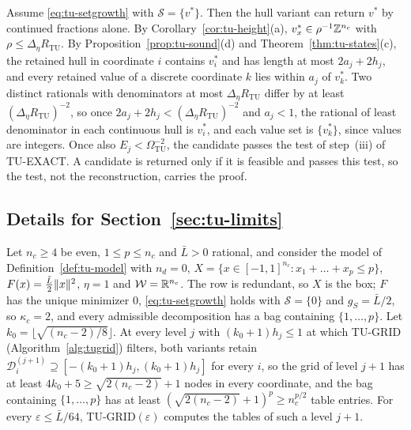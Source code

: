 \begin{remark}\label{rem:tu-cf}
Assume \eqref{eq:tu-setgrowth} with $\mathcal S=\{v^*\}$. Then the hull
variant can return $v^*$ by continued fractions alone. By
Corollary~\ref{cor:tu-height}(a), $v^*_x\in\rho^{-1}\mathbb Z^{n_c}$ with
$\rho\le\Delta_\eta R_{\mathrm{TU}}$. By Proposition~\ref{prop:tu-sound}(d)
and Theorem~\ref{thm:tu-states}(c), the retained hull in coordinate $i$
contains $v^*_i$ and has length at most $2a_j+2h_j$, and every retained value
of a discrete coordinate $k$ lies within $a_j$ of $v^*_k$. Two distinct rationals with denominators at most
$\Delta_\eta R_{\mathrm{TU}}$ differ by at least $(\Delta_\eta R_{\mathrm{TU}})^{-2}$,
so once $2a_j+2h_j<(\Delta_\eta R_{\mathrm{TU}})^{-2}$ and $a_j<1$, the rational
of least denominator in each continuous hull is $v^*_i$, and each value set
is $\{v^*_k\}$, since values are integers. Once also
$E_j<\Omega_{\mathrm{TU}}^{-2}$, the candidate passes the test of
step~(iii) of TU-EXACT. A candidate is returned only if it is feasible and
passes this test, so the test, not the reconstruction, carries the proof.
\end{remark}

\subsection{Details for Section~\ref{sec:tu-limits}}\label{app:tu-limits}

\begin{lemma}\label{lem:tu-uniform}
Let $n_c\ge4$ be even, $1\le p\le n_c$ and $\bar L>0$ rational, and consider
the model of Definition~\ref{def:tu-model} with $n_d=0$,
$X=\{x\in[-1,1]^{n_c}:x_1+\dots+x_p\le p\}$, $F(x)=\frac{\bar L}2\lVert x\rVert^2$,
$\eta=1$ and $\mathcal W=\mathbb R^{n_c}$. The row is redundant, so $X$ is the box;
$F$ has the unique minimizer $0$, \eqref{eq:tu-setgrowth} holds with
$\mathcal S=\{0\}$ and $g_S=\bar L/2$, so $\kappa_c=2$, and every admissible
decomposition has a bag containing $\{1,\dots,p\}$. Let
$k_0=\lfloor\sqrt{(n_c-2)/8}\rfloor$. At every level $j$ with
$(k_0+1)h_j\le1$ at which TU-GRID (Algorithm~\ref{alg:tugrid}) filters, both
variants retain $\mathcal D^{(j+1)}_i\supseteq[-(k_0+1)h_j,(k_0+1)h_j]$ for
every $i$, so the grid of level $j+1$ has at least $4k_0+5\ge\sqrt{2(n_c-2)}+1$ nodes in
every coordinate, and the bag containing $\{1,\dots,p\}$ has at least
$(\sqrt{2(n_c-2)}+1)^p\ge n_c^{p/2}$ table entries. For every
$\varepsilon\le\bar L/64$, TU-GRID$(\varepsilon)$ computes the tables of such
a level $j+1$.
\end{lemma}


